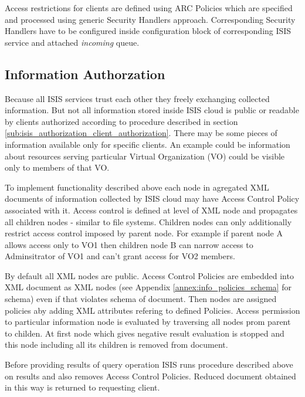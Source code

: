\documentclass{book}
\begin{document}
Access restrictions for clients are defined using ARC Policies which are specified and 
processed using generic Security Handlers approach. Corresponding Security Handlers have to be 
configured inside configuration block of corresponding ISIS service and attached 
\textit{incoming} queue.



\subsection{Information Authorzation}
\label{sub:isis_authorization_information_authorization}

Because all ISIS services trust each other they freely exchanging collected information. But 
not all information stored inside ISIS cloud is public or readable by clients authorized according 
to procedure described in section \ref{sub:isis_authorization_client_authorization}. There
may be some pieces of information available only for specific clients. An example could be 
information about resources serving particular Virtual Organization (VO) could be visible only to
members of that VO.

To implement functionality described above each node in agregated XML documents of information
collected by ISIS cloud may have Access Control Policy associated with it. Access control is 
defined at level of XML node and propagates all children nodes - similar to file systems.
Children nodes can only additionally restrict access control imposed by parent node. For example
if parent node A allows access only to VO1 then children node B can narrow access to Adminsitrator 
of VO1 and can't grant access for VO2 members.

By default all XML nodes are public. Access Control Policies are embedded into XML document
as XML nodes (see Appendix \ref{annex:info_policies_schema} for schema) even if that violates schema 
of document. Then nodes are assigned policies aby adding XML attributes refering to defined Policies.
Access permission to particular information node is evaluated by traversing all nodes prom 
parent to childen. At first node which gives negative result evaluation is stopped and
this node including all its children is removed from document.

Before providing results of query operation ISIS runs procedure described above on results and 
also removes Access Control Policies. Reduced document obtained in this way is returned to
requesting client.
\end{document}
